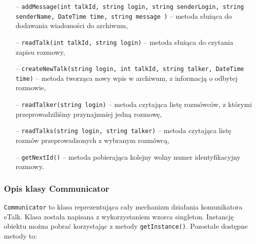 \documentclass[a4paper,12pt]{article}
\begin{document}
\begin{itemize}
    \item[--] \texttt{addMessage(int talkId, string login, string senderLogin, string senderName, DateTime time, string message )} -- metoda służąca do dodawania wiadomości do archiwum,
    \item[--] \texttt{readTalk(int talkId, string login)} -- metoda służąca do czytania zapisu rozmowy,
    \item[--] \texttt{createNewTalk(string login, int talkId, string talker, DateTime time)} -- metoda tworząca nowy wpis w archiwum, z informacją o odbytej rozmowie,
    \item[--] \texttt{readTalker(string login)} -- metoda czytająca listę rozmówców, z którymi przeprowadziliśmy przynajmniej jedną rozmowę,
    \item[--] \texttt{readTalks(string login, string talker)} -- metoda czytająca listę rozmów przeprowadzonych z wybranym rozmówcą,
    \item[--] \texttt{getNextId()} -- metoda pobierająca kolejny wolny numer identyfikacyjny rozmowy.
\end{itemize} 

\subsubsection[Opis klasy Communicator]{Opis klasy Communicator}
\texttt{Communicator} to klasa reprezentująca cały mechanizm działania komunikatora eTalk. Klasa została napisana z wykorzystaniem wzorca singleton. Instancję obiektu można pobrać korzystając z metody \texttt{getInstance()}. Pozostałe dostępne metody to:
\end{document}
